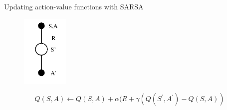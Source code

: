 \bgroup
\begin{frame}{Updating action-value functions with SARSA}
\begin{figure}
\centering
\includegraphics[width=0.2\textwidth]{img/sarsa.pdf}
\end{figure}
\begin{equation*}
Q(S,A) \leftarrow Q(S,A) + \alpha (R + \gamma (Q(S^{\prime}, A^{\prime}) - Q(S,A))
\end{equation*}
\end{frame}
\egroup